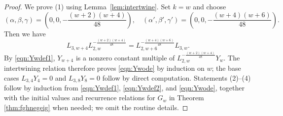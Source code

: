 \documentclass[10pt,reqno]{amsproc}
\newcommand{\1}{\mathds{1}}	%
\theoremstyle{definition}
\theoremstyle{remark}
\begin{document}
\begin{proof}
We prove (1) using Lemma~\ref{lem:intertwine}.
Set $k = w$ and choose
\[
    (\alpha,\beta,\gamma) = \left(0,0,-\frac{(w+2)(w+4)}{48}\right), \quad
    (\alpha',\beta',\gamma') = \left(0,0,-\frac{(w+4)(w+6)}{48}\right).
\]
Then we have
\[
    L_{3,w+4} L_{2,w}^{-\frac{(w+2)(w+4)}{48}} = L_{2,w+6}^{-\frac{(w+4)(w+6)}{48}} L_{3,w}.
\]
By \eqref{eqn:Ywdef1}, $Y_{w+4}$ is a nonzero constant multiple of $L_{2,w}^{-\frac{(w+2)(w+4)}{48}} Y_w$.
The intertwining relation therefore proves \eqref{eqn:Ywode} by induction on $w$; the base cases $L_{3,4}Y_4 = 0$ and $L_{3,8}Y_8 = 0$ follow by direct computation.
Statements (2)--(4) follow by induction from \eqref{eqn:Ywdef1}, \eqref{eqn:Ywdef2}, and \eqref{eqn:Ywode}, together with the initial values and recurrence relations for $G_w$ in Theorem \ref{thm:fghnegeig} when needed; we omit the routine details.
\end{proof}
\end{document}
